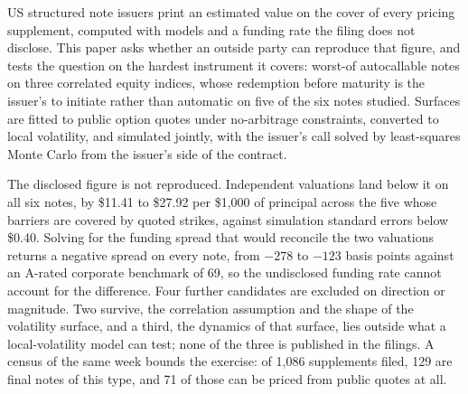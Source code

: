 \noindent
US structured note issuers print an estimated value on the cover of every
pricing supplement, computed with models and a funding rate the filing does not
disclose. This paper asks whether an outside party can reproduce that figure,
and tests the question on the hardest instrument it covers: worst-of
autocallable notes on three correlated equity indices, whose redemption before
maturity is the issuer's to initiate rather than automatic on five of the six
notes studied. Surfaces
are fitted to public option quotes under no-arbitrage constraints, converted to
local volatility, and simulated jointly, with the issuer's call solved by
least-squares Monte Carlo from the issuer's side of the contract.

The disclosed figure is not reproduced. Independent valuations land below it on
all six notes, by \$11.41 to \$27.92 per \$1{,}000 of principal across the five
whose barriers are covered by quoted strikes, against simulation standard
errors below \$0.40. Solving for the funding spread that would reconcile the
two valuations returns a negative spread on every note, from $-278$ to $-123$
basis points against an A-rated corporate benchmark of 69, so the undisclosed
funding rate cannot account for the difference. Four further candidates are
excluded on direction or magnitude. Two survive, the correlation assumption and
the shape of the volatility surface, and a third, the dynamics of that surface,
lies outside what a local-volatility model can test; none of the three is
published in the filings. A
census of the same week bounds the exercise: of 1{,}086 supplements filed, 129
are final notes of this type, and 71 of those can be priced from public quotes
at all.
